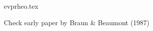 
\begin{flushright} {\tiny {\color{gray} evprheo.tex}} \end{flushright}

Check early paper by Braun \& Beaumont (1987) \cite{brbe87}

\cite{asmo12}
\cite{hepk14}
\cite{daws16}
